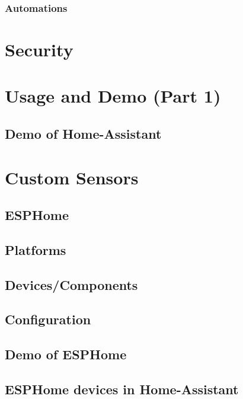 \documentclass[aspectratio=169]{beamer}
\begin{document}
\subsubsection{Automations}

\section{Security}
\frame{\sectionpage}

\section{Usage and Demo (Part 1)}
\frame{\sectionpage}

\subsection{Demo of Home-Assistant}
\frame{\subsectionpage}

\section{Custom Sensors}
\frame{\sectionpage}
\subsection{ESPHome}
\frame{\subsectionpage}

\subsection{Platforms}
\frame{\subsectionpage}
\subsection{Devices/Components}
\frame{\subsectionpage}
\subsection{Configuration}
\frame{\subsectionpage}
\subsection{Demo of ESPHome}
\frame{\subsectionpage}
\subsection{ESPHome devices in Home-Assistant}
\frame{\subsectionpage}
\end{document}
